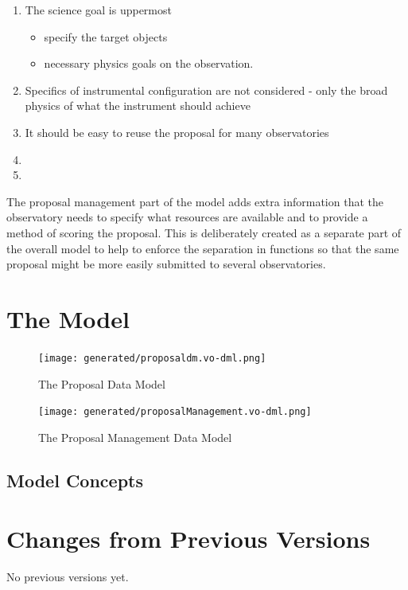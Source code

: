 \documentclass[11pt,a4paper]{ivoa}
\begin{document}
\begin{enumerate}
    \item The science goal is uppermost
    \begin{itemize}
        \item specify the target objects
        \item necessary physics goals on the observation.
    \end{itemize}
    \item Specifics of instrumental configuration are not considered - only the broad physics of what the instrument should achieve
    \item It should be easy to reuse the proposal for many observatories
    \item
    \item
\end{enumerate}

The proposal management part of the model adds extra information that the observatory needs to specify what resources are available
and to provide a method of scoring the proposal. This is deliberately created as a separate part of the overall model to help
to enforce the separation in functions so that the same proposal might be more easily submitted to several observatories.

\section{The Model}

\begin{figure}
    \centering
\texttt{[image: generated/proposaldm.vo-dml.png]}
\caption{The Proposal Data Model}
\label{fig:propdm}
\end{figure}

\begin{figure}
    \centering
    \texttt{[image: generated/proposalManagement.vo-dml.png]}
    \caption{The Proposal Management Data Model}
    \label{fig:propmdm}
\end{figure}

\subsection{Model Concepts}


\appendix
\section{Changes from Previous Versions}

No previous versions yet.  



\end{document}
